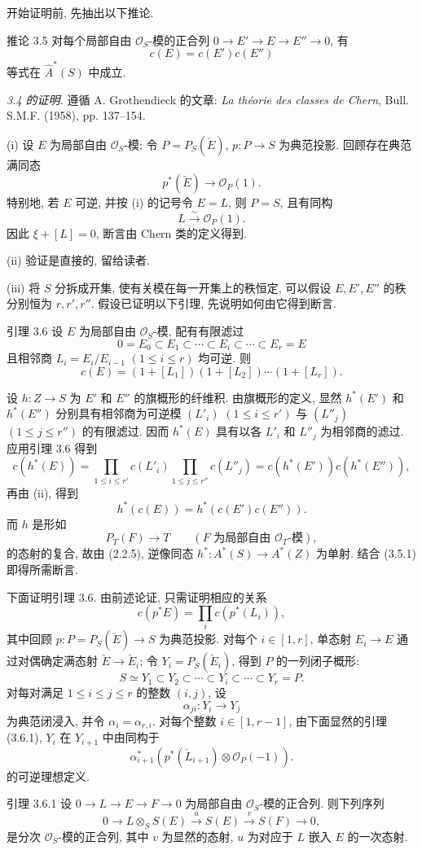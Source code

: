 开始证明前, 先抽出以下推论.

\begin{statement}{推论 3.5}
对每个局部自由 $\mathcal O_S$-模的正合列 $0\to E'\to E\to E''\to0$, 有
\[
c(E)=c(E')c(E'')
\]
等式在 $\widehat A^*(S)$ 中成立.
\end{statement}

\emph{3.4 的证明.} 遵循 A. Grothendieck 的文章: \emph{La théorie des classes de Chern}, Bull. S.M.F. (1958), pp. 137--154.

(i) 设 $E$ 为局部自由 $\mathcal O_S$-模; 令 $P=P_S(\check E)$, $p:P\to S$ 为典范投影. 回顾存在典范满同态
\[
p^*(\check E)\longrightarrow \mathcal O_P(1).
\]
特别地, 若 $E$ 可逆, 并按 (i) 的记号令 $E=L$, 则 $P=S$, 且有同构
\[
L\xrightarrow{\sim}\mathcal O_P(1).
\]
因此 $\xi+[L]=0$, 断言由 Chern 类的定义得到.

(ii) 验证是直接的, 留给读者.

(iii) 将 $S$ 分拆成开集, 使有关模在每一开集上的秩恒定, 可以假设 $E,E',E''$ 的秩分别恒为 $r,r',r''$. 假设已证明以下引理, 先说明如何由它得到断言.

\begin{statement}{引理 3.6}
设 $E$ 为局部自由 $\mathcal O_S$-模, 配有有限滤过
\[
0=E_0\subset E_1\subset\cdots\subset E_i\subset\cdots\subset E_r=E
\]
且相邻商 $L_i=E_i/E_{i-1}$ $(1\le i\le r)$ 均可逆. 则
\[
c(E)=(1+[L_1])(1+[L_2])\cdots(1+[L_r]).
\]
\end{statement}

设 $h:Z\to S$ 为 $E'$ 和 $E''$ 的旗概形的纤维积. 由旗概形的定义, 显然 $h^*(E')$ 和 $h^*(E'')$ 分别具有相邻商为可逆模 $(L'_i)$ $(1\le i\le r')$ 与 $(L''_j)$ $(1\le j\le r'')$ 的有限滤过. 因而 $h^*(E)$ 具有以各 $L'_i$ 和 $L''_j$ 为相邻商的滤过. 应用引理 3.6 得到
\[
c(h^*(E))=
\prod_{1\le i\le r'}c(L'_i)\prod_{1\le j\le r''}c(L''_j)
=c(h^*(E'))c(h^*(E'')),
\]
再由 (ii), 得到
\[
h^*(c(E))=h^*(c(E')c(E'')).
\tag{3.5.1}
\]
而 $h$ 是形如
\[
P_T(F)\longrightarrow T
\qquad (F\text{ 为局部自由 }\mathcal O_T\text{-模}),
\]
的态射的复合, 故由 (2.2.5), 逆像同态 $h^*:A^*(S)\to A^*(Z)$ 为单射. 结合 (3.5.1) 即得所需断言.

下面证明引理 3.6. 由前述论证, 只需证明相应的关系
\[
c(p^*E)=\prod_i c(p^*(L_i)),
\]
其中回顾 $p:P=P_S(\check E)\to S$ 为典范投影. 对每个 $i\in[1,r]$, 单态射 $E_i\to E$ 通过对偶确定满态射 $\check E\to\check E_i$; 令 $Y_i=P_S(\check E_i)$, 得到 $P$ 的一列闭子概形:
\[
S\simeq Y_1\subset Y_2\subset\cdots\subset Y_i\subset\cdots\subset Y_r=P.
\]
对每对满足 $1\le i\le j\le r$ 的整数 $(i,j)$, 设
\[
\alpha_{ji}:Y_i\to Y_j
\]
为典范闭浸入, 并令 $\alpha_i=\alpha_{r,i}$. 对每个整数 $i\in[1,r-1]$, 由下面显然的引理 (3.6.1), $Y_i$ 在 $Y_{i+1}$ 中由同构于
\[
\alpha_{i+1}^*(p^*(\check L_{i+1})\otimes\mathcal O_P(-1)).
\]
的可逆理想定义.
\begin{statement}{引理 3.6.1}
设 $0\to L\to E\to F\to0$ 为局部自由 $\mathcal O_S$-模的正合列. 则下列序列
\[
0\to L\otimes_S S(E)\xrightarrow{u}S(E)\xrightarrow{v}S(F)\to0,
\]
是分次 $\mathcal O_S$-模的正合列, 其中 $v$ 为显然的态射, $u$ 为对应于 $L$ 嵌入 $E$ 的一次态射.
\end{statement}

